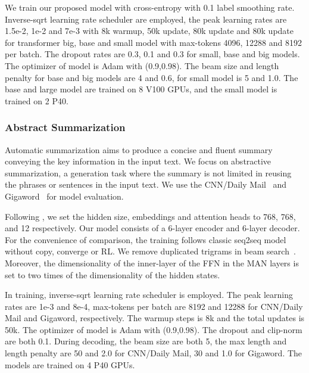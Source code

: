 \documentclass[11pt]{article}
\begin{document}
We train our proposed model with cross-entropy with 0.1 label smoothing rate. Inverse-sqrt learning rate scheduler are employed, the peak learning rates are 1.5e-2, 1e-2 and 7e-3 with 8k warmup, 50k update, 80k update and 80k update for transformer big, base and small model with max-tokens 4096, 12288 and 8192 per batch. The dropout rates are 0.3, 0.1 and 0.3 for small, base and big models. The optimizer of model is Adam with (0.9,0.98). The beam size and length penalty for base and big models are 4 and 0.6, for small model is 5 and 1.0. The base and large model are trained on 8 V100 GPUs, and the small model is trained on 2 P40.

\subsubsection{Abstract Summarization}
\label{abstract-summarization}
Automatic summarization aims to produce a concise and fluent summary conveying the key information in the input text. We focus on abstractive summarization, a generation task where the summary is not limited in reusing the phrases or sentences in the input text. We use the CNN/Daily Mail~\cite{see2017get} and Gigaword~\cite{rush2015neural} for model evaluation. 

Following \citet{song2019mass}, we set the hidden size, embeddings and attention heads to 768, 768, and 12 respectively. Our model consists of a 6-layer encoder and 6-layer decoder. For the convenience of comparison, the training follows classic seq2seq model without copy, converge or RL. We remove duplicated trigrams in beam search~\cite{paulus2017deep}. Moreover, the dimensionality of the inner-layer of the FFN in the MAN layers is set to two times of the dimensionality of the hidden states.

In training, inverse-sqrt learning rate scheduler is employed. The peak learning rates are 1e-3 and 8e-4, max-tokens per batch are 8192 and 12288 for CNN/Daily Mail and Gigaword, respectively. The warmup steps is 8k and the total updates is 50k. The optimizer of model is Adam with (0.9,0.98). The dropout and clip-norm are both 0.1. During decoding, the beam size are both 5, the max length and length penalty are 50 and 2.0 for CNN/Daily Mail, 30 and 1.0 for Gigaword. The models are trained on 4 P40 GPUs.
\end{document}
